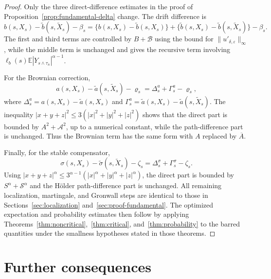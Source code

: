 \documentclass[10pt,a4paper]{amsart}
\newcommand{\E}{\mathbb{E}}
\newcommand{\1}{\mathbf{1}}
\newcommand{\wt}{\tilde}
\newcommand{\eps}{\varepsilon}
\begin{document}
\begin{proof}
Only the three direct-difference estimates in the proof of Proposition~\ref{prop:fundamental-delta} change. The drift difference is
\[
  b(s,X_s)-\wt b(s,\wt X_s)-\beta_s
  =\{b(s,X_s)-\wt b(s,X_s)\}
   +\{\wt b(s,X_s)-\wt b(s,\wt X_s)\}-\beta_s.
\]
The first and third terms are controlled by $B+\mathcal B$ using the bound for $\|u'_{\delta,\eps}\|_\infty$, while the middle term is unchanged and gives the recursive term involving $\ell_b(s)\E|Y_{s\wedge\tau_n}|^{\alpha-1}$.

For the Brownian correction,
\[
  a(s,X_s)-\wt a(s,\wt X_s)-\varrho_s
  =\Delta_s^a+\Gamma_s^a-\varrho_s,
\]
where $\Delta_s^a=a(s,X_s)-\wt a(s,X_s)$ and $\Gamma_s^a=\wt a(s,X_s)-\wt a(s,\wt X_s)$. The inequality $|x+y+z|^2\le3(|x|^2+|y|^2+|z|^2)$ shows that the direct part is bounded by $A^2+\mathcal A^2$, up to a numerical constant, while the path-difference part is unchanged. Thus the Brownian term has the same form with $A$ replaced by $\overline A$.

Finally, for the stable compensator,
\[
  \sigma(s,X_s)-\wt\sigma(s,\wt X_s)-\zeta_s
  =\Delta_s^\sigma+\Gamma_s^\sigma-\zeta_s.
\]
Using $|x+y+z|^\alpha\le 3^{\alpha-1}(|x|^\alpha+|y|^\alpha+|z|^\alpha)$, the direct part is bounded by $S^\alpha+\mathcal S^\alpha$ and the H\"older path-difference part is unchanged. All remaining localization, martingale, and Gronwall steps are identical to those in Sections~\ref{sec:localization} and~\ref{sec:proof-fundamental}. The optimized expectation and probability estimates then follow by applying Theorems~\ref{thm:noncritical},~\ref{thm:critical}, and~\ref{thm:probability} to the barred quantities under the smallness hypotheses stated in those theorems.
\end{proof}

\section{Further consequences}
\label{sec:consequences}
\end{document}
